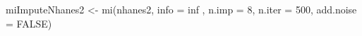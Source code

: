 \begin{Schunk}
\begin{Sinput}
 miImputeNhanes2 <- mi(nhanes2, info = inf , n.imp = 8,  n.iter = 500, add.noise = FALSE)
\end{Sinput}
\end{Schunk}
